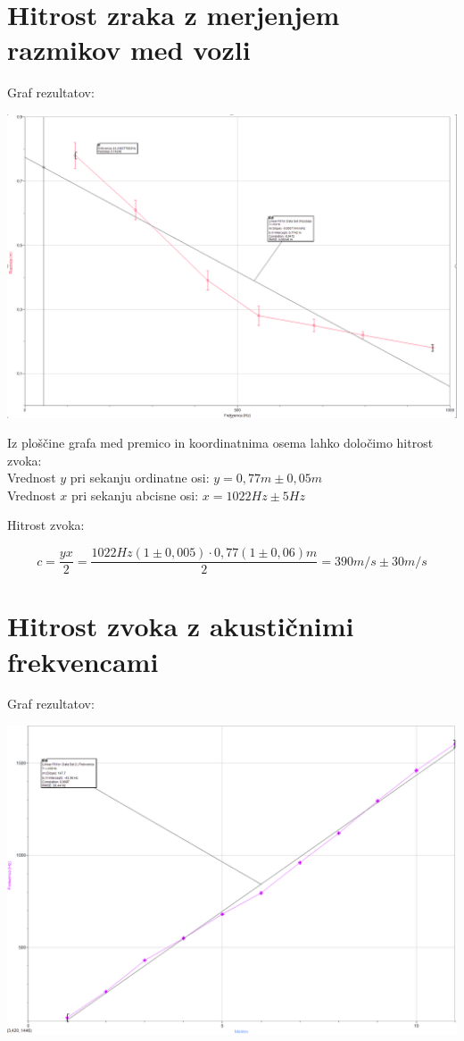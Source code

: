 \documentclass[a4paper]{report}
\begin{document}
\section*{Hitrost zraka z merjenjem razmikov med vozli}

Graf rezultatov:

\includegraphics[width=\textwidth]{Lambda}

\noindent Iz ploščine grafa med premico in koordinatnima osema lahko določimo hitrost zvoka:\\
Vrednost $y$ pri sekanju ordinatne osi: $y = 0,77m \pm 0,05m$ \\
Vrednost $x$ pri sekanju abcisne osi: $x=1022Hz \pm 5Hz$

\noindent Hitrost zvoka:

\begin{equation}
  c = \frac{yx}{2} = \frac{1022Hz(1 \pm 0,005 ) \cdot 0,77(1 \pm 0,06)m}{2} = 390m/s\pm 30m/s  
\end{equation}

\section*{Hitrost zvoka z akustičnimi frekvencami}

Graf rezultatov:

\includegraphics[width=\textwidth]{Frekvence}
\end{document}
